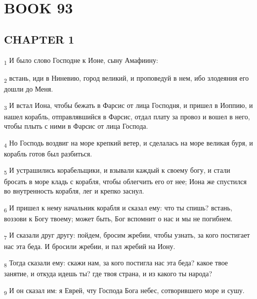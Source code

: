 \section{BOOK 93}
\subsection{CHAPTER 1}
\begin{tcolorbox}
\textsubscript{1} И было слово Господне к Ионе, сыну Амафиину:
\end{tcolorbox}
\begin{tcolorbox}
\textsubscript{2} встань, иди в Ниневию, город великий, и проповедуй в нем, ибо злодеяния его дошли до Меня.
\end{tcolorbox}
\begin{tcolorbox}
\textsubscript{3} И встал Иона, чтобы бежать в Фарсис от лица Господня, и пришел в Иоппию, и нашел корабль, отправлявшийся в Фарсис, отдал плату за провоз и вошел в него, чтобы плыть с ними в Фарсис от лица Господа.
\end{tcolorbox}
\begin{tcolorbox}
\textsubscript{4} Но Господь воздвиг на море крепкий ветер, и сделалась на море великая буря, и корабль готов был разбиться.
\end{tcolorbox}
\begin{tcolorbox}
\textsubscript{5} И устрашились корабельщики, и взывали каждый к своему богу, и стали бросать в море кладь с корабля, чтобы облегчить его от нее; Иона же спустился во внутренность корабля, лег и крепко заснул.
\end{tcolorbox}
\begin{tcolorbox}
\textsubscript{6} И пришел к нему начальник корабля и сказал ему: что ты спишь? встань, воззови к Богу твоему; может быть, Бог вспомнит о нас и мы не погибнем.
\end{tcolorbox}
\begin{tcolorbox}
\textsubscript{7} И сказали друг другу: пойдем, бросим жребии, чтобы узнать, за кого постигает нас эта беда. И бросили жребии, и пал жребий на Иону.
\end{tcolorbox}
\begin{tcolorbox}
\textsubscript{8} Тогда сказали ему: скажи нам, за кого постигла нас эта беда? какое твое занятие, и откуда идешь ты? где твоя страна, и из какого ты народа?
\end{tcolorbox}
\begin{tcolorbox}
\textsubscript{9} И он сказал им: я Еврей, чту Господа Бога небес, сотворившего море и сушу.
\end{tcolorbox}
